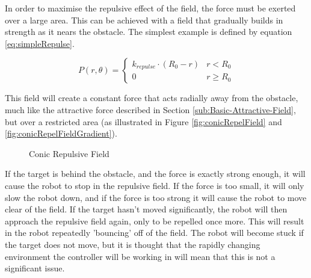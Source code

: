 \documentclass[10pt]{article}
\begin{document}
In order to maximise the repulsive effect of the field, the force must be
exerted over a large area. This can be achieved with a field that gradually
builds in strength as it nears the obstacle. The simplest example is defined by
equation \ref{eq:simpleRepulse}.

\[
P\left(r,\theta\right)=\begin{cases}
k_{repulse}\cdot \left(R_{0} - r\right) & r<R_{0}\\
0 & r\geq R_{0}
\end{cases}
\label{eq:simpleRepulse}
\]

This field will create a constant force that acts radially away from the
obstacle, much like the attractive force described in Section
\ref{sub:Basic-Attractive-Field}, but over a restricted area (as illustrated in
Figure \ref{fig:conicRepelField} and \ref{fig:conicRepelFieldGradient}).

\begin{figure}
 \centering
 \caption{Conic Repulsive Field}
\end{figure}

If the target is behind the obstacle, and the force is exactly strong enough, it
will cause the robot to stop in the repulsive field. If the force is too small,
it will only slow the robot down, and if the force is too strong it will cause
the robot to move clear of the field. If the target hasn't moved significantly,
the robot will then approach the repulsive field again, only to be repelled once
more. This will result in the robot repeatedly 'bouncing' off of the field. The
robot will become stuck if the target does not move, but it is thought that the
rapidly changing environment the controller will be working in will mean that
this is not a significant issue.
\end{document}
